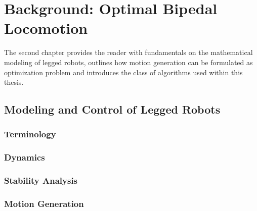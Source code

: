 
\chapter{Background: Optimal Bipedal Locomotion}\label{c2}
The second chapter provides the reader with fundamentals on the mathematical modeling of legged robots, outlines how motion generation can be formulated as optimization problem and introduces the class of algorithms used within this thesis. 

\section{Modeling and Control of Legged Robots}
\subsection{Terminology}
\subsection{Dynamics}
\subsection{Stability Analysis}
\subsection{Motion Generation}
